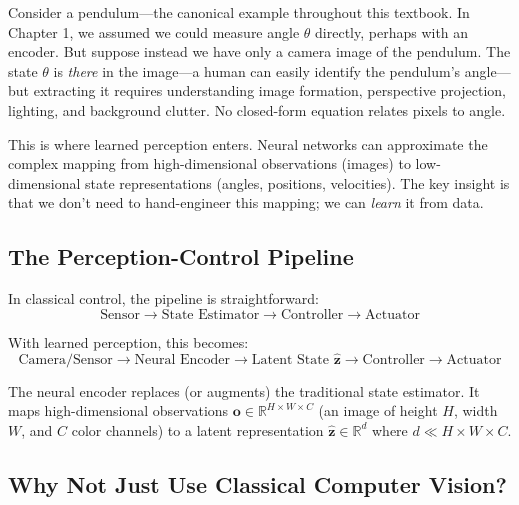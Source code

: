 Consider a pendulum---the canonical example throughout this textbook. In Chapter 1, we assumed we could measure angle $\theta$ directly, perhaps with an encoder. But suppose instead we have only a camera image of the pendulum. The state $\theta$ is \textit{there} in the image---a human can easily identify the pendulum's angle---but extracting it requires understanding image formation, perspective projection, lighting, and background clutter. No closed-form equation relates pixels to angle.

This is where learned perception enters. Neural networks can approximate the complex mapping from high-dimensional observations (images) to low-dimensional state representations (angles, positions, velocities). The key insight is that we don't need to hand-engineer this mapping; we can \textit{learn} it from data.

\subsection{The Perception-Control Pipeline}

In classical control, the pipeline is straightforward:
\begin{equation}
\text{Sensor} \rightarrow \text{State Estimator} \rightarrow \text{Controller} \rightarrow \text{Actuator}
\end{equation}

With learned perception, this becomes:
\begin{equation}
\text{Camera/Sensor} \rightarrow \text{Neural Encoder} \rightarrow \text{Latent State } \hat{\mathbf{z}} \rightarrow \text{Controller} \rightarrow \text{Actuator}
\end{equation}

The neural encoder replaces (or augments) the traditional state estimator. It maps high-dimensional observations $\mathbf{o} \in \mathbb{R}^{H \times W \times C}$ (an image of height $H$, width $W$, and $C$ color channels) to a latent representation $\hat{\mathbf{z}} \in \mathbb{R}^d$ where $d \ll H \times W \times C$.


\subsection{Why Not Just Use Classical Computer Vision?}

